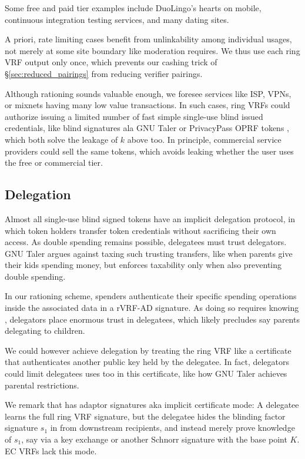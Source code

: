 Some free and paid tier examples include DuoLingo's hearts on mobile, 
continuous integration testing services, and many dating sites.

A priori, rate limiting cases benefit from unlinkability among individual
usages, not merely at some site boundary like moderation requires.
We thus use each ring VRF output only once, which prevents our cashing
trick of \S\ref{sec:reduced_pairings} from reducing verifier pairings.

Although rationing sounds valuable enough, we foresee services like ISP,
VPNs, or mixnets having many low value transactions.
In such cases, ring VRFs could authorize issuing a limited number of
fast simple single-use blind issued credentials, like blind signatures
ala GNU Taler \cite{taler} or PrivacyPass OPRF tokens \cite{PrivacyPass},
 which both solve the leakage of $k$ above too.
%
In principle, commercial service providers could sell the same tokens,
which avoids leaking whether the user uses the free or commercial tier.


\subsection{Delegation}

Almost all single-use blind signed tokens have an implicit delegation
protocol, in which token holders transfer token credentials without
sacrificing their own access.
As double spending remains possible, delegatees must trust delegators.
GNU Taler \cite{taler} argues against taxing such trusting transfers,
like when parents give their kids spending money, but enforces taxability
only when also preventing double spending.

In our rationing scheme, spenders authenticate their specific spending
operations inside the associated data \aux in a rVRF-AD signature.
As doing so requires knowing \sk, delegators place enormous trust in
delegatees, which likely precludes say parents delegating to children.

We could however achieve delegation by treating the ring VRF like a
certificate that authenticates another public key held by the delegatee.
In fact, delegators could limit delegatees uses too in this certificate,
like how GNU Taler achieves parental restrictions. %

We remark that \PedVRF has adaptor signatures aka implicit certificate mode:
A delegatee learns the full ring VRF signature, but the delegatee hides
the blinding factor signature $s_1$ in \PedVRF from downstream recipients,
and instead merely prove knowledge of $s_1$, say via
 a key exchange or another Schnorr signature with the base point $K$.
EC VRFs lack this mode.



